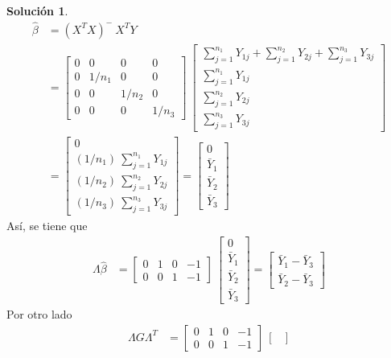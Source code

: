 \documentclass[12pt]{article}
\theoremstyle{plain}
\theoremstyle{definition}
\theoremstyle{definition}
\theoremstyle{definition}
\newtheorem*{solution}{Solución}
\begin{document}
\begin{solution}
\begin{align*}
\hat{\beta}&= (X^TX)^-\ X^TY\\
&= \begin{bmatrix}
0 & 0 & 0 & 0 \\
0 & 1/n_1 & 0 & 0 \\
0 & 0 & 1/n_2 & 0 \\
0 & 0 & 0 & 1/n_3
\end{bmatrix}\ \begin{bmatrix}
\sum^{n_1}_{j=1}Y_{1j} + \sum^{n_2}_{j=1}Y_{2j} + \sum^{n_3}_{j=1}Y_{3j} \\
\sum^{n_1}_{j=1}Y_{1j} \\
\sum^{n_2}_{j=1}Y_{2j} \\
\sum^{n_3}_{j=1}Y_{3j}
\end{bmatrix} \\
&=\begin{bmatrix}
0 \\
(1/n_1) \ \sum^{n_1}_{j=1}Y_{1j} \\
(1/n_2) \ \sum^{n_2}_{j=1}Y_{2j} \\
(1/n_3) \ \sum^{n_3}_{j=1}Y_{3j}
\end{bmatrix} =
\begin{bmatrix}
0 \\
\bar{Y}_1 \\
\bar{Y}_2 \\
\bar{Y}_3
\end{bmatrix}
\end{align*}
Así, se tiene que
\begin{align*}
\Lambda\hat{\beta}&= \begin{bmatrix}
0&1&0&-1\\
0&0&1&-1
\end{bmatrix}\ 
\begin{bmatrix}
0\\
\bar{Y}_1\\
\bar{Y}_2\\
\bar{Y}_3
\end{bmatrix}
=\begin{bmatrix}
\bar{Y}_1-\bar{Y}_3 \\
\bar{Y}_2-\bar{Y}_3
\end{bmatrix}
\end{align*}
Por otro lado
\begin{align*}
\Lambda G \Lambda^T &=  \begin{bmatrix}
0&1&0&-1\\
0&0&1&-1
\end{bmatrix} \ \begin{bmatrix}

\end{bmatrix}
\end{align*}
\end{solution}
\end{document}
